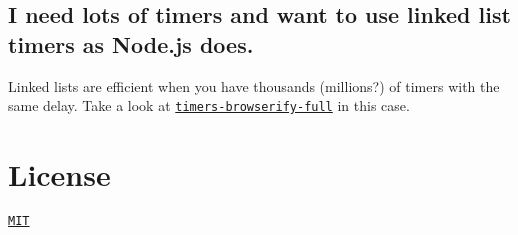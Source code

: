 \subsection*{I need lots of timers and want to use linked list timers as Node.\+js does.}

Linked lists are efficient when you have thousands (millions?) of timers with the same delay. Take a look at \href{https://www.npmjs.com/package/timers-browserify-full}{\tt timers-\/browserify-\/full} in this case.

\section*{License}

\href{http://jryans.mit-license.org/}{\tt M\+IT} 